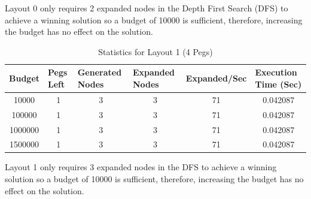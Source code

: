 \documentclass[12pt,a4paper]{article}
\begin{document}
Layout 0 only requires 2 expanded nodes in the Depth First Search (DFS) to achieve a winning solution so a budget of 10000 is sufficient, therefore, increasing the budget has no effect on the solution.\\


\begin{table}[H]
\caption{Statistics for Layout 1 (4 Pegs)}
\label{tab:my-table}

\begin{tabular}{|c|c|c|c|c|c|}
\hline
Budget  & \multicolumn{1}{l|}{Pegs Left} & \multicolumn{1}{l|}{Generated Nodes} & \multicolumn{1}{l|}{Expanded Nodes} & \multicolumn{1}{l|}{Expanded/Sec} & \multicolumn{1}{l|}{Execution Time (Sec)} \\ \hline
10000   & 1                              & 3                                    & 3                                   & 71                                   & 0.042087                                              \\ \hline
100000  & 1                              & 3                                    & 3                                   & 71                                   & 0.042087                                              \\ \hline
1000000 & 1                              & 3                                    & 3                                   & 71                                   & 0.042087                                              \\ \hline
1500000 & 1                              & 3                                    & 3                                   & 71                                   & 0.042087                                              \\ \hline
\end{tabular}
\end{table}
Layout 1 only requires 3 expanded nodes in the DFS to achieve a winning solution so a budget of 10000 is sufficient, therefore, increasing the budget has no effect on the solution.\\
\end{document}

